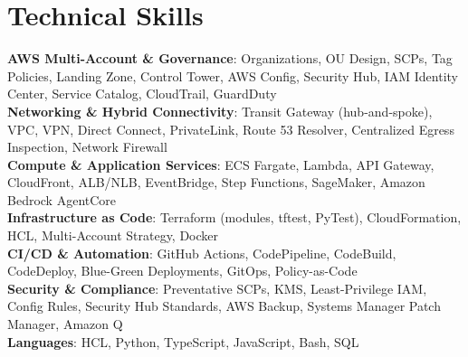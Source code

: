 \section{\textbf{Technical Skills}}
\vspace{-2pt}
\begin{itemize}[leftmargin=0.05in, label={}]
    \small{\item{
     \textbf{AWS Multi-Account \& Governance}{: Organizations, OU Design, SCPs, Tag Policies, Landing Zone, Control Tower, AWS Config, Security Hub, IAM Identity Center, Service Catalog, CloudTrail, GuardDuty} \\
     \textbf{Networking \& Hybrid Connectivity}{: Transit Gateway (hub-and-spoke), VPC, VPN, Direct Connect, PrivateLink, Route 53 Resolver, Centralized Egress Inspection, Network Firewall} \\
     \textbf{Compute \& Application Services}{: ECS Fargate, Lambda, API Gateway, CloudFront, ALB/NLB, EventBridge, Step Functions, SageMaker, Amazon Bedrock AgentCore} \\
     \textbf{Infrastructure as Code}{: Terraform (modules, tftest, PyTest), CloudFormation, HCL, Multi-Account Strategy, Docker} \\
     \textbf{CI/CD \& Automation}{: GitHub Actions, CodePipeline, CodeBuild, CodeDeploy, Blue-Green Deployments, GitOps, Policy-as-Code} \\
     \textbf{Security \& Compliance}{: Preventative SCPs, KMS, Least-Privilege IAM, Config Rules, Security Hub Standards, AWS Backup, Systems Manager Patch Manager, Amazon Q} \\
     \textbf{Languages}{: HCL, Python, TypeScript, JavaScript, Bash, SQL}
    }}
\end{itemize}
\vspace{-2mm}
